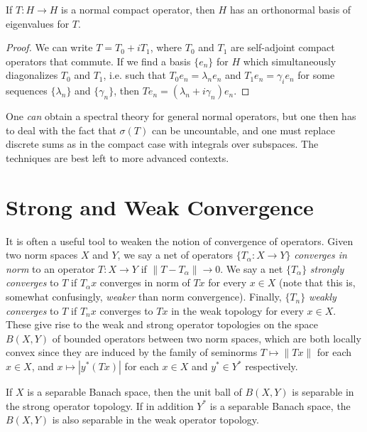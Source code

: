 \begin{corollary}
    If $T: H \to H$ is a normal compact operator, then $H$ has an orthonormal basis of eigenvalues for $T$.
\end{corollary}
\begin{proof}
    We can write $T = T_0 + i T_1$, where $T_0$ and $T_1$ are self-adjoint compact operators that commute. If we find a basis $\{ e_n \}$ for $H$ which simultaneously diagonalizes $T_0$ and $T_1$, i.e. such that $T_0e_n = \lambda_n e_n$ and $T_1 e_n= \gamma_i e_n$ for some sequences $\{ \lambda_n \}$ and $\{ \gamma_n \}$, then $Te_n = (\lambda_n + i \gamma_n) e_n$.
\end{proof}

\begin{remark}
    One \emph{can} obtain a spectral theory for general normal operators, but one then has to deal with the fact that $\sigma(T)$ can be uncountable, and one must replace discrete sums as in the compact case with integrals over subspaces. The techniques are best left to more advanced contexts.
\end{remark}









\section{Strong and Weak Convergence}

It is often a useful tool to weaken the notion of convergence of operators. Given two norm spaces $X$ and $Y$, we say a net of operators $\{ T_\alpha : X \to Y \}$ \emph{converges in norm} to an operator $T: X \to Y$ if $\| T - T_\alpha \| \to 0$. We say a net $\{ T_\alpha \}$ \emph{strongly converges} to $T$ if $T_\alpha x$ converges in norm of $Tx$ for every $x \in X$ (note that this is, somewhat confusingly, \emph{weaker} than norm convergence). Finally, $\{ T_n \}$ \emph{weakly converges} to $T$ if $T_n x$ converges to $Tx$ in the weak topology for every $x \in X$. These give rise to the weak and strong operator topologies on the space $B(X,Y)$ of bounded operators between two norm spaces, which are both locally convex since they are induced by the family of seminorms $T \mapsto \| Tx \|$ for each $x \in X$, and $x \mapsto |y^*(Tx)|$ for each $x \in X$ and $y^* \in Y^*$ respectively.

If $X$ is a separable Banach space, then the unit ball of $B(X,Y)$ is separable in the strong operator topology. If in addition $Y^*$ is a separable Banach space, the $B(X,Y)$ is also separable in the weak operator topology.


